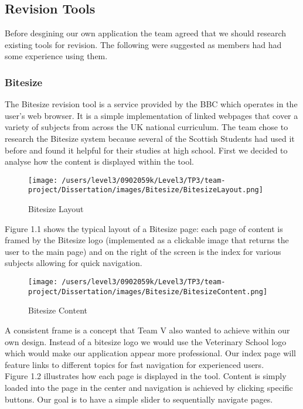 \documentclass{l3proj}
\begin{document}
\subsection{Revision Tools}

Before desgining our own application the team agreed that we should
research existing tools for revision. The following were suggested as
members had had some experience using them. 

\subsubsection{Bitesize}
The Bitesize revision tool is a service provided by the BBC which
operates in the user's web browser. It is a simple implementation of
linked webpages that cover a variety of subjects from across the UK
national curriculum. The team chose to research the Bitesize system
because several of the Scottish Students had used it before and found
it helpful for their studies at high school. First we decided to analyse how the
content is displayed within the tool.\\

\begin{figure}[!htb]
\caption{Bitesize Layout}
 \centering
\texttt{[image: /users/level3/0902059k/Level3/TP3/team-project/Dissertation/images/Bitesize/BitesizeLayout.png]}
\end{figure}

Figure 1.1 shows the typical layout of a Bitesize page: each page of
content is framed by the Bitesize logo (implemented as a clickable image that
returns the user to the main page) and on the right of the screen is
the index for various subjects allowing for quick navigation.\\

\begin{figure}[!ht]
\caption{Bitesize Content}
 \centering
\texttt{[image: /users/level3/0902059k/Level3/TP3/team-project/Dissertation/images/Bitesize/BitesizeContent.png]}
\end{figure}

A consistent frame is a concept that Team V also wanted to achieve
within our own design. Instead of a bitesize logo we would use the
Veterinary School logo which would make our application appear more
professional. Our index page will feature links to different topics
for fast navigation for experienced users.\\


Figure 1.2 illustrates how each page is displayed in the tool. Content
is simply loaded into the page in the center and navigation is
achieved by clicking specific buttons. Our goal is to have a simple
slider to sequentially navigate pages.\\
\newpage
\end{document}
